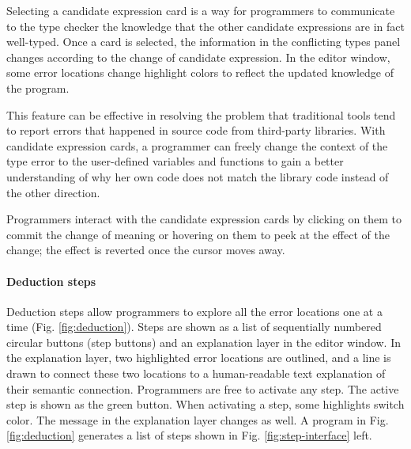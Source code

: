 Selecting a candidate expression card is a way for programmers to communicate to the type checker the knowledge that the other candidate expressions are in fact well-typed. Once a card is selected, the information in the conflicting types panel changes according to the change of candidate expression. In the editor window, some error locations change highlight colors to reflect the updated knowledge of the program. 


This feature can be effective in resolving the problem that traditional tools tend to report errors that happened in source code from third-party libraries. With candidate expression cards, a programmer can freely change the context of the type error to the user-defined variables and functions to gain a better understanding of why her own code does not match the library code instead of the other direction.


Programmers interact with the candidate expression cards by clicking on them to commit the change of meaning or hovering on them to peek at the effect of the change; the effect is reverted once the cursor moves away.


\paragraph{Deduction steps}  \label{sub:deduction-steps}



Deduction steps allow programmers to explore all the error locations one at a time (Fig. \ref{fig:deduction}). Steps are shown as a list of sequentially  numbered circular buttons (step buttons) and an explanation layer in the editor window. In the explanation layer, two highlighted error locations are outlined, and a line is drawn to connect these two locations to a human-readable text explanation of
their semantic connection. Programmers are free to activate any step. The active step is shown as the green button. When activating a step, some highlights switch color. The message in the explanation layer changes as well. A program in Fig. \ref{fig:deduction} generates a list of steps shown in Fig. \ref{fig:step-interface} left.

